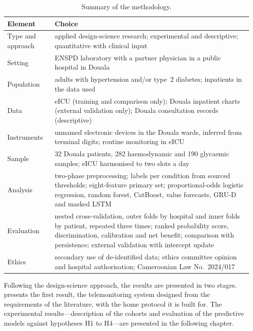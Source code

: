 \begin{table}[htbp]
\centering\footnotesize
\caption{Summary of the methodology.}\label{tab:meth-summary}
\begin{tabularx}{\textwidth}{@{}>{\raggedright\arraybackslash}p{3.2cm} X@{}}
\toprule
\textbf{Element} & \textbf{Choice} \\
\midrule
Type and approach & applied design-science research; experimental and descriptive; quantitative with clinical input \\
Setting & ENSPD laboratory with a partner physician in a public hospital in Douala \\
Population & adults with hypertension and/or type~2 diabetes; inpatients in the data used \\
Data & eICU (training and comparison only); Douala inpatient charts (external validation only); Douala consultation records (descriptive) \\
Instruments & unnamed electronic devices in the Douala wards, inferred from terminal digits; routine monitoring in eICU \\
Sample & 32 Douala patients, 282 haemodynamic and 190 glycaemic samples; eICU harmonised to two slots a day \\
Analysis & two-phase preprocessing; labels per condition from sourced thresholds; eight-feature primary set; proportional-odds logistic regression, random forest, CatBoost, value forecasts, GRU-D and masked LSTM \\
Evaluation & nested cross-validation, outer folds by hospital and inner folds by patient, repeated three times; ranked probability score, discrimination, calibration and net benefit; comparison with persistence; external validation with intercept update \\
Ethics & secondary use of de-identified data; ethics committee opinion and hospital authorisation; Cameroonian Law No.~2024/017 \\
\bottomrule
\end{tabularx}
\end{table}

Following the design-science approach, the results are presented in two stages.  presents the first result, the telemonitoring system designed from the requirements of the literature, with the home protocol it is built for. The experimental results---description of the cohorts and evaluation of the predictive models against hypotheses H1 to H4---are presented in the following chapter.
